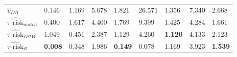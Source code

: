 \begin{table}[ht]
\begin{tabular}{lllllllll}
  $\hat v_{DR}$ & 0.146 & 1.169 & 5.678 & 1.821 & 26.571 & 1.356 & 7.340 & 2.668 \\ 
  $\widehat{\tau\text{-risk}}_{match}$ & 0.400 & 1.617 & 4.400 & 1.769 & 9.399 & 1.425 & 4.284 & 1.661 \\ 
  $\widehat{\tau\text{-risk}}_{IPTW}$ & 1.049 & 0.451 & 2.387 & 1.129 & 4.260 & \bfseries{1.120} & 4.133 & 2.123 \\ 
  $\widehat{\tau\text{-risk}}_{R}$ & \bfseries{0.008} & 0.348 & 1.986 & \bfseries{0.149} & 0.078 & 1.169 & 3.923 & \bfseries{1.539} \\ 
     \hline
\end{tabular}
\label{tmse-table}
\end{table}

